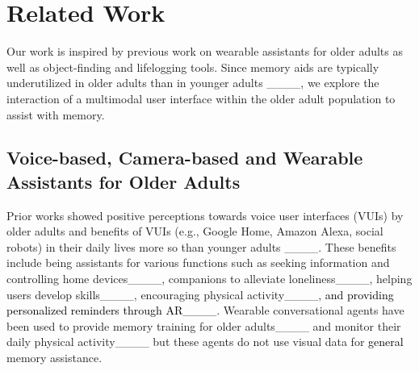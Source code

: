\section{Related Work}
Our work is inspired by previous work on wearable assistants for older adults as well as object-finding and lifelogging tools. Since memory aids are typically underutilized in older adults than in younger adults ____, we explore the interaction of a multimodal user interface within the older adult population to assist with memory. 

    

\subsection{Voice-based, Camera-based and Wearable Assistants for Older Adults}
\label{relatedworks_assistants}

Prior works showed positive perceptions towards voice user interfaces (VUIs) by older adults and benefits of VUIs (e.g., Google Home, Amazon Alexa, social robots) in their daily lives more so than younger adults ____. These benefits include being assistants for various functions such as seeking information and controlling home devices____, companions to alleviate loneliness____, helping users develop skills____, encouraging physical activity____, \textcolor{black}{and providing personalized reminders through AR____}. Wearable conversational agents have been used to provide memory training for older adults____ and monitor their daily physical activity____ but these agents do not use visual data for \textcolor{black}{general} memory assistance. 

